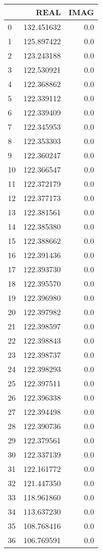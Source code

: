 \begin{tabular}{lrr}
\toprule
{} &        REAL &  IMAG \\
\midrule
0  &  132.451632 &   0.0 \\
1  &  125.897422 &   0.0 \\
2  &  123.243188 &   0.0 \\
3  &  122.530921 &   0.0 \\
4  &  122.368862 &   0.0 \\
5  &  122.339112 &   0.0 \\
6  &  122.339409 &   0.0 \\
7  &  122.345953 &   0.0 \\
8  &  122.353303 &   0.0 \\
9  &  122.360247 &   0.0 \\
10 &  122.366547 &   0.0 \\
11 &  122.372179 &   0.0 \\
12 &  122.377173 &   0.0 \\
13 &  122.381561 &   0.0 \\
14 &  122.385380 &   0.0 \\
15 &  122.388662 &   0.0 \\
16 &  122.391436 &   0.0 \\
17 &  122.393730 &   0.0 \\
18 &  122.395570 &   0.0 \\
19 &  122.396980 &   0.0 \\
20 &  122.397982 &   0.0 \\
21 &  122.398597 &   0.0 \\
22 &  122.398843 &   0.0 \\
23 &  122.398737 &   0.0 \\
24 &  122.398293 &   0.0 \\
25 &  122.397511 &   0.0 \\
26 &  122.396338 &   0.0 \\
27 &  122.394498 &   0.0 \\
28 &  122.390736 &   0.0 \\
29 &  122.379561 &   0.0 \\
30 &  122.337139 &   0.0 \\
31 &  122.161772 &   0.0 \\
32 &  121.447350 &   0.0 \\
33 &  118.961860 &   0.0 \\
34 &  113.637230 &   0.0 \\
35 &  108.768416 &   0.0 \\
36 &  106.769591 &   0.0 \\

\end{tabular}
